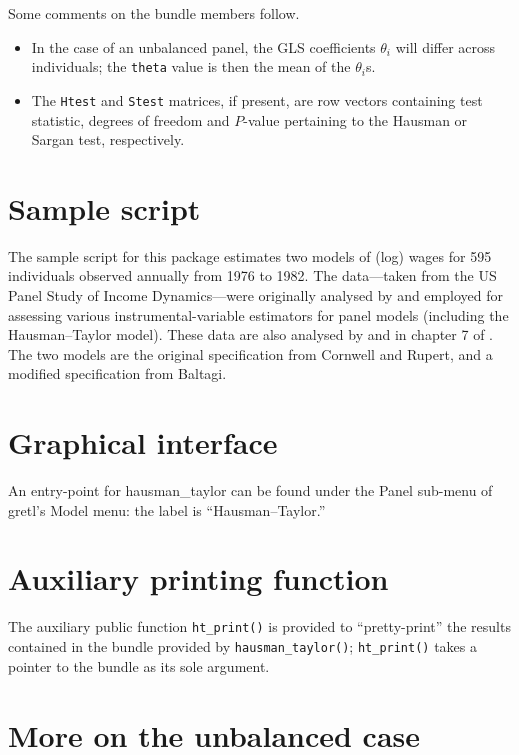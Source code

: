 \documentclass{article}
\begin{document}
Some comments on the bundle members follow.

\begin{itemize}

\item In the case of an unbalanced panel, the GLS coefficients
  $\theta_i$ will differ across individuals; the \texttt{theta} value
  is then the mean of the $\theta_i$s.

\item The \texttt{Htest} and \texttt{Stest} matrices, if present, are
  row vectors containing test statistic, degrees of freedom and
  $P$-value pertaining to the Hausman or Sargan test, respectively.
\end{itemize}

\section{Sample script}

The sample script for this package estimates two models of (log) wages
for 595 individuals observed annually from 1976 to 1982.  The
data---taken from the US Panel Study of Income Dynamics---were
originally analysed by \cite{cornwell88} and employed for assessing
various instrumental-variable estimators for panel models (including
the Hausman--Taylor model). These data are also analysed by
\cite{baltagi-akom90} and in chapter 7 of \cite{baltagi05}. The two
models are the original specification from Cornwell and Rupert, and a
modified specification from Baltagi.

\section{Graphical interface}

An entry-point for \textsf{hausman\_taylor} can be found under the
\textsf{Panel} sub-menu of gretl's \textsf{Model} menu: the label is
``Hausman--Taylor.'' %


\section{Auxiliary printing function}

The auxiliary public function \texttt{ht\_print()} is provided to
``pretty-print'' the results contained in the bundle provided by
\texttt{hausman\_taylor()}; \texttt{ht\_print()} takes a pointer to
the bundle as its sole argument.

\section{More on the unbalanced case}
\label{sec:unbal}





\end{document}

